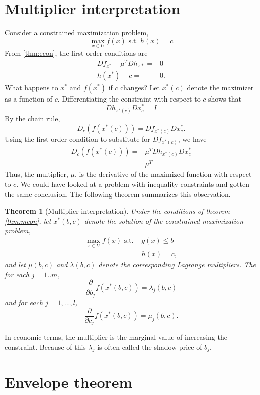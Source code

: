 \documentclass[12pt,reqno]{amsart}
\newtheorem{theorem}{Theorem}[section]
\theoremstyle{definition}
\begin{document}
\section{Multiplier interpretation}

Consider a constrained maximization problem,
\[ \max_{x \in U} f(x) \text{ s.t. } h(x) = c \]
From \ref{thm:econ}, the first order conditions are
\begin{align*}
 Df_{x^*} - \mu^T Dh_{x*} = & 0 \\
 h(x^*) - c = & 0.
\end{align*}
What happens to $x^*$ and $f(x^*)$ if $c$ changes? Let $x^*(c)$ denote
the maximizer as a function of $c$. Differentiating the constraint
with respect to $c$ shows that
\[ Dh_{x^*(c)} Dx^*_c = I \]
By the chain rule,
\[ D_c \left( f(x^*(c)) \right) = Df_{x^*(c)} Dx^*_c. \] 
Using the first order condition to substitute for $Df_{x^*(c)}$, we
have
\begin{align*}
  D_c \left( f(x^*(c)) \right) = & \mu^T Dh_{x^*(c)}Dx^*_c \\
  = & \mu^T 
\end{align*}
Thus, the multiplier, $\mu$, is the derivative of the maximized
function with respect to $c$.  We could have looked at a
problem with inequality constraints and gotten the same
conclusion. The following theorem summarizes this observation.
\begin{theorem}[Multiplier interpretation]\label{thm:muint} 
  Under the conditions of theorem \ref{thm:mcon}, let $x^*(b,c)$
  denote the solution of the constrained maximization problem,
  \begin{align*}
    \max_{x \in U} f(x) \text{ s.t. } & g(x) \leq b \\
    & h(x) = c ,
  \end{align*}
  and let $\mu(b,c)$ and $\lambda(b,c)$ denote the corresponding
  Lagrange multipliers. The for each $j=1..m$,
  \[ \frac{\partial}{\partial b_j} f(x^*(b,c)) = \lambda_j(b,c) \]
  and for each $j=1,...,l$,
  \[ \frac{\partial}{\partial c_j} f(x^*(b,c)) = \mu_j(b,c). \]
\end{theorem} 
In economic terms, the multiplier is the
marginal value of increasing the constraint. Because of this 
$\lambda_j$ is often called the shadow price of $b_j$. 

\section{Envelope theorem}
\end{document}
